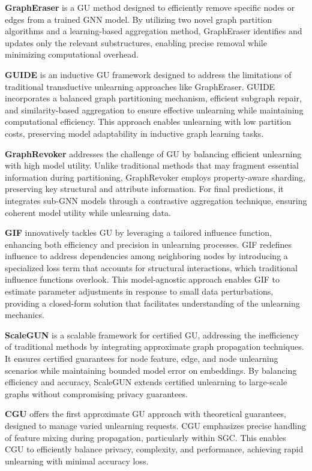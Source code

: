 \textbf{GraphEraser} \cite{chen2022graph_eraser} is a GU method designed to efficiently remove specific nodes or edges from a trained GNN model. By utilizing two novel graph partition algorithms and a learning-based aggregation method, GraphEraser identifies and updates only the relevant substructures, enabling precise removal while minimizing computational overhead.

\textbf{GUIDE} \cite{wang2023guide} is an inductive GU framework designed to address the limitations of traditional transductive unlearning approaches like GraphEraser. GUIDE incorporates a balanced graph partitioning mechanism, efficient subgraph repair, and similarity-based aggregation to ensure effective unlearning while maintaining computational efficiency. This approach enables unlearning with low partition costs, preserving model adaptability in inductive graph learning tasks.

\textbf{GraphRevoker} \cite{2024ZhangGraphRevoker} addresses the challenge of GU by balancing efficient unlearning with high model utility. Unlike traditional methods that may fragment essential information during partitioning, GraphRevoker employs property-aware sharding, preserving key structural and attribute information. For final predictions, it integrates sub-GNN models through a contrastive aggregation technique, ensuring coherent model utility while unlearning data.

\textbf{GIF} \cite{wu2023gif} innovatively tackles GU by leveraging a tailored influence function, enhancing both efficiency and precision in unlearning processes. GIF redefines influence to address dependencies among neighboring nodes by introducing a specialized loss term that accounts for structural interactions, which traditional influence functions overlook. This model-agnostic approach enables GIF to estimate parameter adjustments in response to small data perturbations, providing a closed-form solution that facilitates understanding of the unlearning mechanics.

\textbf{ScaleGUN} \cite{scaluGUN} is a scalable framework for certified GU, addressing the inefficiency of traditional methods by integrating approximate graph propagation techniques. It ensures certified guarantees for node feature, edge, and node unlearning scenarios while maintaining bounded model error on embeddings. By balancing efficiency and accuracy, ScaleGUN extends certified unlearning to large-scale graphs without compromising privacy guarantees.

\textbf{CGU} \cite{chien2022cgu} offers the first approximate GU approach with theoretical guarantees, designed to manage varied unlearning requests. CGU emphasizes precise handling of feature mixing during propagation, particularly within SGC. This enables CGU to efficiently balance privacy, complexity, and performance, achieving rapid unlearning with minimal accuracy loss.


